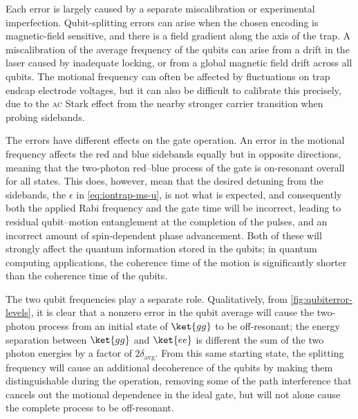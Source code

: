 Each error is largely caused by a separate miscalibration or experimental imperfection.
Qubit-splitting errors can arise when the chosen encoding is magnetic-field sensitive, and there is a field gradient along the axis of the trap.
A miscalibration of the average frequency of the qubits can arise from a drift in the laser caused by inadequate locking, or from a global magnetic field drift across all qubits.
The motional frequency can often be affected by fluctuations on trap endcap electrode voltages, but it can also be difficult to calibrate this precisely, due to the \textsc{ac} Stark effect from the nearby stronger carrier transition when probing sidebands.

The errors have different effects on the gate operation.
An error in the motional frequency affects the red and blue sidebands equally but in opposite directions, meaning that the two-photon red--blue process of the gate is on-resonant overall for all states.
This does, however, mean that the desired detuning from the sidebands, the $\epsilon$ in \cref{eq:iontrap-ms-u}, is not what is expected, and consequently both the applied Rabi frequency and the gate time will be incorrect, leading to residual qubit--motion entanglement at the completion of the pulses, and an incorrect amount of spin-dependent phase advancement.
Both of these will strongly affect the quantum information stored in the qubits; in quantum computing applications, the coherence time of the motion is significantly shorter than the coherence time of the qubits.

The two qubit frequencies play a separate role.
Qualitatively, from \cref{fig:qubiterror-levels}, it is clear that a nonzero error in the qubit average will cause the two-photon process from an initial state of $\ket{gg}$ to be off-resonant; the energy separation between $\ket{gg}$ and $\ket{ee}$ is different the sum of the two photon energies by a factor of $2\delta_{\text{avg}}$.
From this same starting state, the splitting frequency will cause an additional decoherence of the qubits by making them distinguishable during the operation, removing some of the path interference that cancels out the motional dependence in the ideal gate, but will not alone cause the complete process to be off-resonant.

